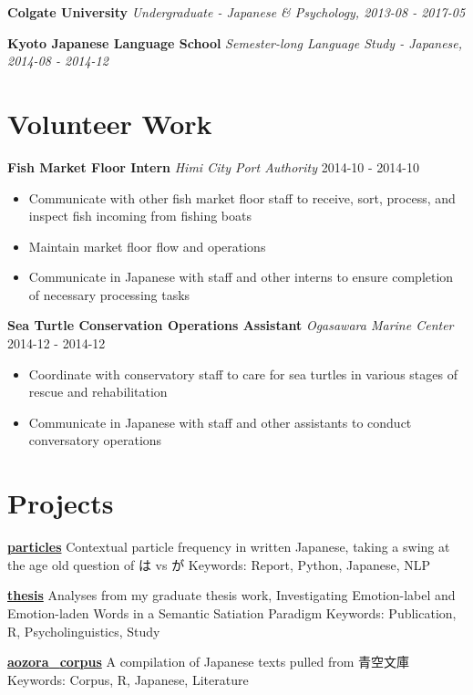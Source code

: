 \documentclass[a4paper,9pt]{extarticle}
\begin{document}
\noindent
\textbf{Colgate University}
\textit{Undergraduate - Japanese \& Psychology, 2013-08 - 2017-05}

\noindent
\textbf{Kyoto Japanese Language School}
\textit{Semester-long Language Study - Japanese, 2014-08 - 2014-12}

\section*{Volunteer Work}

\noindent
\textbf{Fish Market Floor Intern}
\noindent
\textit{Himi City Port Authority} \hfill 2014-10 - 2014-10
\begin{itemize}
\item Communicate with other fish market floor staff to receive, sort, process, and inspect fish incoming from fishing boats
\item Maintain market floor flow and operations
\item Communicate in Japanese with staff and other interns to ensure completion of necessary processing tasks
\end{itemize}

\noindent
\textbf{Sea Turtle Conservation Operations Assistant}
\noindent
\textit{Ogasawara Marine Center} \hfill 2014-12 - 2014-12
\begin{itemize}
\item Coordinate with conservatory staff to care for sea turtles in various stages of rescue and rehabilitation
\item Communicate in Japanese with staff and other assistants to conduct conversatory operations
\end{itemize}

\section*{Projects}

\noindent
\textbf{\href{https://github.com/ryancahildebrandt/particles}{particles}}
Contextual particle frequency in written Japanese, taking a swing at the age old question of は vs が
Keywords: Report, Python, Japanese, NLP

\noindent
\textbf{\href{https://github.com/ryancahildebrandt/thesis}{thesis}}
Analyses from my graduate thesis work, Investigating Emotion-label and Emotion-laden Words in a Semantic Satiation Paradigm
Keywords: Publication, R, Psycholinguistics, Study

\noindent
\textbf{\href{https://github.com/ryancahildebrandt/aozora_corpus}{aozora{\_}corpus}}
A compilation of Japanese texts pulled from 青空文庫
Keywords: Corpus, R, Japanese, Literature
\end{document}
